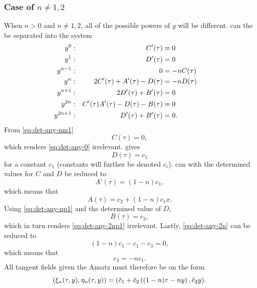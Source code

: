 \subsubsection{Case of \texorpdfstring{\(n\neq1,2\)}{n not 1 or 2}}

When \(n>0\) and \(n\neq1,2\), all of the possible powers of \(y\) will be different.
 can the be separated into the system
\begin{subequations}
  \begin{flalign}
    y^0:      && C'(\tau) &= 0                               &&\FlLabel{eq:det-any-0}\\
    y^1:      && D'(\tau) &= 0                               &&\FlLabel{eq:det-any-1} \\
    y^{n-1}:  && 0 &= -nC(\tau)                              &&\FlLabel{eq:det-any-nm1} \\
    y^n:      && 2C'(\tau) + A'(\tau) - D(\tau) &= -nD(\tau) &&\FlLabel{eq:det-any-n} \\
    y^{n+1}:  && 2D'(\tau) + B'(\tau) &= 0                   &&\FlLabel{eq:det-any-np1} \\
    y^{2n}:   && C'(\tau) A'(\tau) - D(\tau) - B(\tau) &= 0  &&\FlLabel{eq:det-any-2n} \\
    y^{2n+1}: && D'(\tau) + B'(\tau) &= 0.                   &&\FlLabel{eq:det-any-2np1}
  \end{flalign}
\end{subequations}
From \cref{eq:det-any-nm1}
\begin{equation}
  C(\tau) = 0,
\end{equation}
which renders \cref{eq:det-any-0} irrelevant.
 gives
\begin{equation}
  D(\tau) = c_1
\end{equation}
for a constant \(c_1\) (constants will further be denoted \(c_i\)).
 can with the determined values for \(C\) and \(D\) be reduced to
\begin{equation}
  A'(\tau) = (1-n) c_1,
\end{equation}
which means that
\begin{equation}
  A(\tau) = c_2 + (1-n) c_1 x.
\end{equation}
Using \cref{eq:det-any-np1} and the determined value of \(D\),
\begin{equation}
  B(\tau) = c_3,
\end{equation}
which in turn renders \cref{eq:det-any-2np1} irrelevant.
Lastly, \cref{eq:det-any-2n} can be reduced to
\begin{equation}
  (1-n) c_1 - c_1 - c_3 = 0,
\end{equation}
which means that
\begin{equation}
  c_3 = -n c_1.
\end{equation}
All tangent fields given the Ansatz must therefore be on the form
\begin{equation} \label{eq:hill-tangent-field-any}
  \pqty{\xi_n(\tau,y),\eta_n(\tau,y)} = 
  \pqty{\tilde{c}_1 + \tilde{c}_2 \left( (1-n) \tau - n y \right), \tilde{c}_2 y}.
\end{equation}

